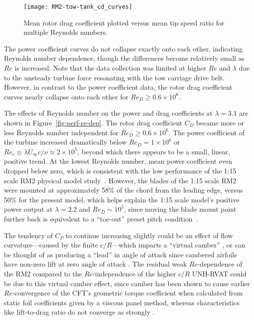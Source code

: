 \begin{figure}
    \texttt{[image: RM2-tow-tank\_cd\_curves]}
    
    \caption{Mean rotor drag coefficient plotted versus mean tip speed ratio for
        multiple Reynolds numbers.}
    
    \label{fig:cd-curves}
\end{figure}

The power coefficient curves do not collapse exactly onto each other, indicating
Reynolds number dependence, though the differences become relatively small as
$Re$ is increased. Note that the data collection was limited at higher $Re$ and
$\lambda$ due to the unsteady turbine force resonating with the tow carriage
drive belt. However, in contrast to the power coefficient data, the rotor drag
coefficient curves nearly collapse onto each other for $Re_D \ge 0.6 \times
10^6$.

The effects of Reynolds number on the power and drag coefficients at
$\lambda=3.1$ are shown in Figure~\ref{fig:perf-re-dep}. The rotor drag
coefficient $C_D$ became more or less Reynolds number independent for $Re_D \ge
0.6 \times 10^6$. The power coefficient of the turbine increased dramatically
below $Re_D = 1 \times 10^6$ or $Re_c \equiv \lambda U_\infty c / \nu \approx 2
\times 10^5$, beyond which there appears to be a small, linear, positive trend.
At the lowest Reynolds number, mean power coefficient even dropped below zero,
which is consistent with the low performance of the 1:15 scale RM2 physical
model study~\cite{Hill2014}. However, the blades of the 1:15 scale RM2 were
mounted at approximately 58\% of the chord from the leading edge, versus 50\%
for the present model, which helps explain the 1:15 scale model's positive power
output at $\lambda=2.2$ and $Re_D \sim 10^5$, since moving the blade mount point
further back is equivalent to a ``toe-out'' preset pitch
condition~\cite{Fiedler2009}.

The tendency of $C_P$ to continue increasing slightly could be an effect of flow
curvature---caused by the finite $c/R$---which imparts a ``virtual camber''
\cite{Migliore1980}, or can be thought of as producing a ``lead'' in angle of
attack since cambered airfoils have non-zero lift at zero angle of attack
\cite{Goude2012}. The residual weak $Re$-dependence of the RM2 compared to the
$Re$-independence of the higher $c/R$ UNH-RVAT could be due to this virtual
camber effect, since camber has been shown to cause earlier $Re$-convergence of
the CFT's geometric torque coefficient when calculated from static foil
coefficients given by a viscous panel method, whereas characteristics like
lift-to-drag ratio do not converge as strongly \cite{Bachant2016-RVAT-Re-dep}.

